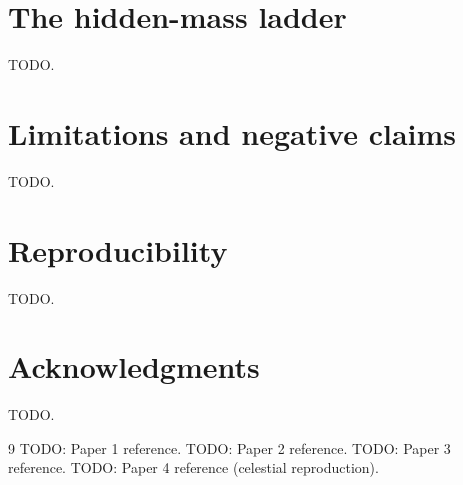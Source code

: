 \documentclass[aps,reprint,amsmath,amssymb,nofootinbib,superscriptaddress,floatfix]{revtex4-2}
\begin{document}
\section{The hidden-mass ladder}
\label{sec:ladder}
TODO.

\section{Limitations and negative claims}
\label{sec:negative}
TODO.

\section{Reproducibility}
\label{sec:repro}
TODO.

\section*{Acknowledgments}
TODO.

\begin{thebibliography}{9}
 TODO: Paper 1 reference.
 TODO: Paper 2 reference.
 TODO: Paper 3 reference.
 TODO: Paper 4 reference (celestial reproduction).
\end{thebibliography}
\end{document}
